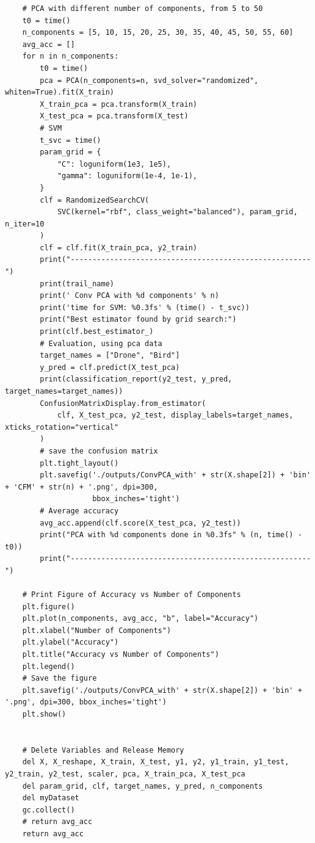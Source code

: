 \documentclass{cta-author}
\begin{document}
\begin{lstlisting}
    # PCA with different number of components, from 5 to 50
    t0 = time()
    n_components = [5, 10, 15, 20, 25, 30, 35, 40, 45, 50, 55, 60]
    avg_acc = []
    for n in n_components:
        t0 = time()
        pca = PCA(n_components=n, svd_solver="randomized", whiten=True).fit(X_train)
        X_train_pca = pca.transform(X_train)
        X_test_pca = pca.transform(X_test)
        # SVM
        t_svc = time()
        param_grid = {
            "C": loguniform(1e3, 1e5),
            "gamma": loguniform(1e-4, 1e-1),
        }
        clf = RandomizedSearchCV(
            SVC(kernel="rbf", class_weight="balanced"), param_grid, n_iter=10
        )
        clf = clf.fit(X_train_pca, y2_train)
        print("-------------------------------------------------------")
        print(trail_name)
        print(' Conv PCA with %d components' % n)
        print('time for SVM: %0.3fs' % (time() - t_svc))
        print("Best estimator found by grid search:")
        print(clf.best_estimator_)
        # Evaluation, using pca data
        target_names = ["Drone", "Bird"]
        y_pred = clf.predict(X_test_pca)
        print(classification_report(y2_test, y_pred, target_names=target_names))
        ConfusionMatrixDisplay.from_estimator(
            clf, X_test_pca, y2_test, display_labels=target_names, xticks_rotation="vertical"
        )
        # save the confusion matrix
        plt.tight_layout()
        plt.savefig('./outputs/ConvPCA_with' + str(X.shape[2]) + 'bin' + 'CFM' + str(n) + '.png', dpi=300,
                    bbox_inches='tight')
        # Average accuracy
        avg_acc.append(clf.score(X_test_pca, y2_test))
        print("PCA with %d components done in %0.3fs" % (n, time() - t0))
        print("-------------------------------------------------------")

    # Print Figure of Accuracy vs Number of Components
    plt.figure()
    plt.plot(n_components, avg_acc, "b", label="Accuracy")
    plt.xlabel("Number of Components")
    plt.ylabel("Accuracy")
    plt.title("Accuracy vs Number of Components")
    plt.legend()
    # Save the figure
    plt.savefig('./outputs/ConvPCA_with' + str(X.shape[2]) + 'bin' + '.png', dpi=300, bbox_inches='tight')
    plt.show()


    # Delete Variables and Release Memory
    del X, X_reshape, X_train, X_test, y1, y2, y1_train, y1_test, y2_train, y2_test, scaler, pca, X_train_pca, X_test_pca
    del param_grid, clf, target_names, y_pred, n_components
    del myDataset
    gc.collect()
    # return avg_acc
    return avg_acc


\end{lstlisting}
\end{document}
